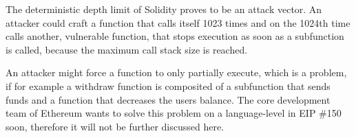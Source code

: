 The deterministic depth limit of Solidity proves to be an attack vector. An attacker could craft a function that calls itself 1023 times and on the 1024th time calls another, vulnerable function, that stops execution as soon as a subfunction is called, because the maximum call stack size is reached. 

An attacker might force a function to only partially execute, which is a problem, if for example a withdraw function is composited of a subfunction that sends funds and a function that decreases the users balance.
The core development team of Ethereum wants to solve this problem on a language-level in EIP \#150 \cite{EIP150} soon, therefore it will not be further discussed here.
